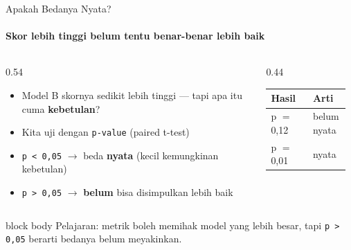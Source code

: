 \documentclass[aspectratio=169,t]{beamer}
\begin{document}
\begin{frame}{Apakah Bedanya Nyata?}
  \framesubtitle{Skor lebih tinggi belum tentu benar-benar lebih baik}
  \begin{columns}[T]
    \begin{column}{0.54\textwidth}
      \begin{itemize}
        \footnotesize
        \item Model B skornya sedikit lebih tinggi --- tapi apa itu cuma \textbf{kebetulan}?
        \item Kita uji dengan \texttt{p-value} (paired t-test)
        \item \texttt{p < 0,05} $\to$ beda \textbf{nyata} (kecil kemungkinan kebetulan)
        \item \texttt{p > 0,05} $\to$ \textbf{belum} bisa disimpulkan lebih baik
      \end{itemize}
    \end{column}
    \begin{column}{0.44\textwidth}
      \begin{center}
      \renewcommand{\arraystretch}{1.25}
      {\scriptsize
      \setlength{\tabcolsep}{4pt}
      \begin{tabular}{@{}p{0.5\linewidth}p{0.4\linewidth}@{}}
        \toprule
        \rowcolor{nvcard!50}
        \textbf{Hasil} & \textbf{Arti} \\
        \midrule
        p $=$ 0,12 & \textcolor{nvorange}{belum nyata} \\
        p $=$ 0,01 & \textcolor{nvgreen}{nyata} \\
        \bottomrule
      \end{tabular}%
      }
      \end{center}
    \end{column}
  \end{columns}
  \vspace{0.2em}
  \begin{beamercolorbox}[rounded=true,shadow=false,sep=4pt]{block body}
    \centering\small\color{white}
    Pelajaran: metrik boleh memihak model yang lebih besar, tapi \texttt{p > 0,05} berarti bedanya belum meyakinkan.
  \end{beamercolorbox}
\end{frame}
\end{document}
